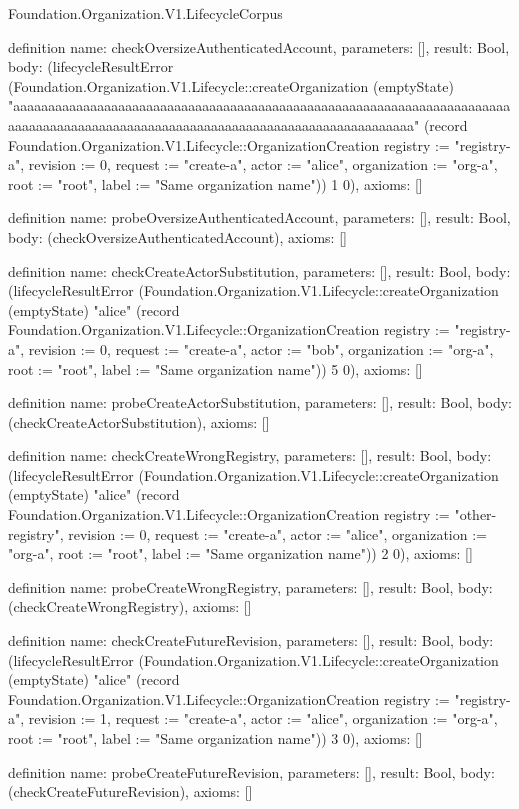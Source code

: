 \begin{lexlean}{Foundation.Organization.V1.LifecycleCorpus}
\begin{semanticmodule}
definition{
  name: checkOversizeAuthenticatedAccount,
  parameters: [],
  result: Bool,
  body: (lifecycleResultError (Foundation.Organization.V1.Lifecycle::createOrganization (emptyState) "aaaaaaaaaaaaaaaaaaaaaaaaaaaaaaaaaaaaaaaaaaaaaaaaaaaaaaaaaaaaaaaaaaaaaaaaaaaaaaaaaaaaaaaaaaaaaaaaaaaaaaaaaaaaaaaaaaaaaaaaaaaaaaaaa" (record Foundation.Organization.V1.Lifecycle::OrganizationCreation {registry := "registry-a", revision := 0, request := "create-a", actor := "alice", organization := "org-a", root := "root", label := "Same organization name"})) 1 0),
  axioms: []
}

definition{
  name: probeOversizeAuthenticatedAccount,
  parameters: [],
  result: Bool,
  body: (checkOversizeAuthenticatedAccount),
  axioms: []
}

definition{
  name: checkCreateActorSubstitution,
  parameters: [],
  result: Bool,
  body: (lifecycleResultError (Foundation.Organization.V1.Lifecycle::createOrganization (emptyState) "alice" (record Foundation.Organization.V1.Lifecycle::OrganizationCreation {registry := "registry-a", revision := 0, request := "create-a", actor := "bob", organization := "org-a", root := "root", label := "Same organization name"})) 5 0),
  axioms: []
}

definition{
  name: probeCreateActorSubstitution,
  parameters: [],
  result: Bool,
  body: (checkCreateActorSubstitution),
  axioms: []
}

definition{
  name: checkCreateWrongRegistry,
  parameters: [],
  result: Bool,
  body: (lifecycleResultError (Foundation.Organization.V1.Lifecycle::createOrganization (emptyState) "alice" (record Foundation.Organization.V1.Lifecycle::OrganizationCreation {registry := "other-registry", revision := 0, request := "create-a", actor := "alice", organization := "org-a", root := "root", label := "Same organization name"})) 2 0),
  axioms: []
}

definition{
  name: probeCreateWrongRegistry,
  parameters: [],
  result: Bool,
  body: (checkCreateWrongRegistry),
  axioms: []
}

definition{
  name: checkCreateFutureRevision,
  parameters: [],
  result: Bool,
  body: (lifecycleResultError (Foundation.Organization.V1.Lifecycle::createOrganization (emptyState) "alice" (record Foundation.Organization.V1.Lifecycle::OrganizationCreation {registry := "registry-a", revision := 1, request := "create-a", actor := "alice", organization := "org-a", root := "root", label := "Same organization name"})) 3 0),
  axioms: []
}

definition{
  name: probeCreateFutureRevision,
  parameters: [],
  result: Bool,
  body: (checkCreateFutureRevision),
  axioms: []
}


\end{semanticmodule}
\end{lexlean}
